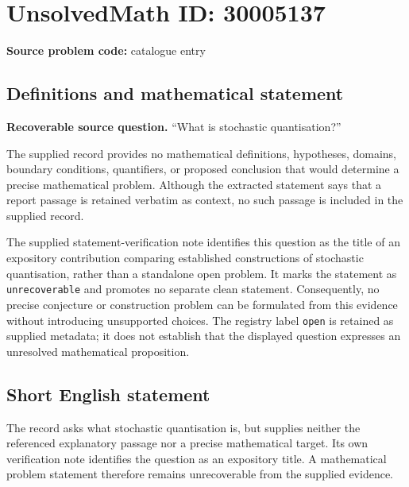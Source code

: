 \documentclass[11pt]{article}
\begin{document}
\section*{UnsolvedMath ID: 30005137}
\textbf{Source problem code:} catalogue entry
\subsection{Definitions and mathematical statement}
\textbf{Recoverable source question.} ``What is stochastic quantisation?''

The supplied record provides no mathematical definitions, hypotheses, domains, boundary conditions, quantifiers, or proposed conclusion that would determine a precise mathematical problem. Although the extracted statement says that a report passage is retained verbatim as context, no such passage is included in the supplied record.

The supplied statement-verification note identifies this question as the title of an expository contribution comparing established constructions of stochastic quantisation, rather than a standalone open problem. It marks the statement as \texttt{unrecoverable} and promotes no separate clean statement. Consequently, no precise conjecture or construction problem can be formulated from this evidence without introducing unsupported choices. The registry label \texttt{open} is retained as supplied metadata; it does not establish that the displayed question expresses an unresolved mathematical proposition.
\subsection{Short English statement}
The record asks what stochastic quantisation is, but supplies neither the referenced explanatory passage nor a precise mathematical target. Its own verification note identifies the question as an expository title. A mathematical problem statement therefore remains unrecoverable from the supplied evidence.
\end{document}
